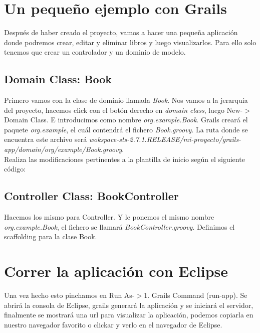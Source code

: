 \documentclass[a4paper,12pt,spanish]{article}
\begin{document}
\section{Un pequeño ejemplo con Grails}

Después de haber creado el proyecto, vamos a hacer una pequeña aplicación donde podremos crear, editar y eliminar libros y luego visualizarlos. Para ello solo tenemos que crear un controlador y un dominio de modelo.

\subsection{Domain Class: Book}

Primero vamos con la clase de dominio llamada {\it Book}. Nos vamos a la jerarquía del proyecto, hacemos click con el botón derecho en {\it domain class}, luego New-$>$Domain Class. E introducimos como nombre {\it org.example.Book}. Grails creará el paquete {\it org.example}, el cuál contendrá el fichero {\it Book.groovy}. La ruta donde se encuentra este archivo será {\it wokspace-sts-2.7.1.RELEASE/mi-proyecto/grails-app/domain/org/example/Book.groovy}.\\

Realiza las modificaciones pertinentes a la plantilla de inicio según el siguiente código:



\subsection{Controller Class: BookController}

Hacemos los mismo para Controller. Y le ponemos el mismo nombre {\it org.example.Book}, el fichero se llamará {\it BookController.groovy}.
Definimos el scaffolding para la clase Book.



\section{Correr la aplicación con Eclipse}

Una vez hecho esto pinchamos en Run As-$>$1. Grails Command (run-app). Se abrirá la consola de Eclipse, grails generará la aplicación y se iniciará el servidor, finalmente se mostrará una url para visualizar la aplicación, podemos copiarla en nuestro navegador favorito o clickar y verlo en el navegador de Eclipse.
\end{document}

